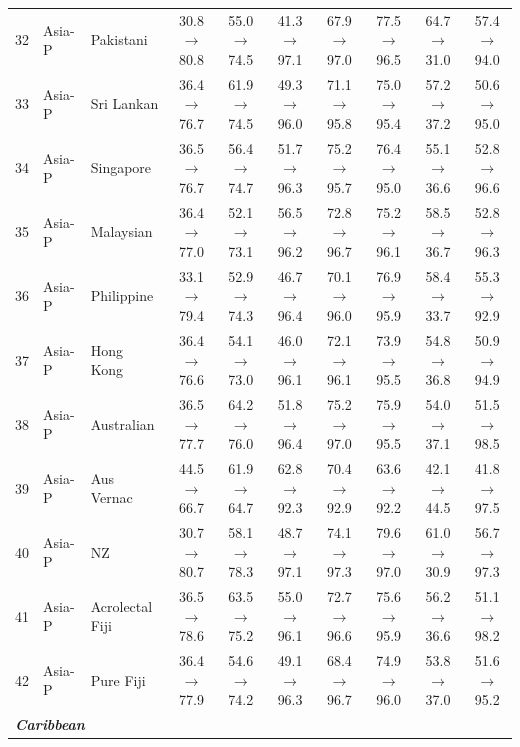 \begin{table}[t]
{\begin{tabular}{rll c c c c c c c}
32 & Asia-P & Pakistani & 30.8$\rightarrow$80.8 & 55.0$\rightarrow$74.5 & 41.3$\rightarrow$97.1 & 67.9$\rightarrow$97.0 & 77.5$\rightarrow$96.5 & 64.7$\rightarrow$31.0 & 57.4$\rightarrow$94.0 \\
33 & Asia-P & Sri Lankan & 36.4$\rightarrow$76.7 & 61.9$\rightarrow$74.5 & 49.3$\rightarrow$96.0 & 71.1$\rightarrow$95.8 & 75.0$\rightarrow$95.4 & 57.2$\rightarrow$37.2 & 50.6$\rightarrow$95.0 \\
34 & Asia-P & Singapore & 36.5$\rightarrow$76.7 & 56.4$\rightarrow$74.7 & 51.7$\rightarrow$96.3 & 75.2$\rightarrow$95.7 & 76.4$\rightarrow$95.0 & 55.1$\rightarrow$36.6 & 52.8$\rightarrow$96.6 \\
35 & Asia-P & Malaysian & 36.4$\rightarrow$77.0 & 52.1$\rightarrow$73.1 & 56.5$\rightarrow$96.2 & 72.8$\rightarrow$96.7 & 75.2$\rightarrow$96.1 & 58.5$\rightarrow$36.7 & 52.8$\rightarrow$96.3 \\
36 & Asia-P & Philippine & 33.1$\rightarrow$79.4 & 52.9$\rightarrow$74.3 & 46.7$\rightarrow$96.4 & 70.1$\rightarrow$96.0 & 76.9$\rightarrow$95.9 & 58.4$\rightarrow$33.7 & 55.3$\rightarrow$92.9 \\
37 & Asia-P & Hong Kong & 36.4$\rightarrow$76.6 & 54.1$\rightarrow$73.0 & 46.0$\rightarrow$96.1 & 72.1$\rightarrow$96.1 & 73.9$\rightarrow$95.5 & 54.8$\rightarrow$36.8 & 50.9$\rightarrow$94.9 \\
38 & Asia-P & Australian & 36.5$\rightarrow$77.7 & 64.2$\rightarrow$76.0 & 51.8$\rightarrow$96.4 & 75.2$\rightarrow$97.0 & 75.9$\rightarrow$95.5 & 54.0$\rightarrow$37.1 & 51.5$\rightarrow$98.5 \\
39 & Asia-P & Aus Vernac & 44.5$\rightarrow$66.7 & 61.9$\rightarrow$64.7 & 62.8$\rightarrow$92.3 & 70.4$\rightarrow$92.9 & 63.6$\rightarrow$92.2 & 42.1$\rightarrow$44.5 & 41.8$\rightarrow$97.5 \\
40 & Asia-P & NZ & 30.7$\rightarrow$80.7 & 58.1$\rightarrow$78.3 & 48.7$\rightarrow$97.1 & 74.1$\rightarrow$97.3 & 79.6$\rightarrow$97.0 & 61.0$\rightarrow$30.9 & 56.7$\rightarrow$97.3 \\
41 & Asia-P & Acrolectal Fiji & 36.5$\rightarrow$78.6 & 63.5$\rightarrow$75.2 & 55.0$\rightarrow$96.1 & 72.7$\rightarrow$96.6 & 75.6$\rightarrow$95.9 & 56.2$\rightarrow$36.6 & 51.1$\rightarrow$98.2 \\
42 & Asia-P & Pure Fiji & 36.4$\rightarrow$77.9 & 54.6$\rightarrow$74.2 & 49.1$\rightarrow$96.3 & 68.4$\rightarrow$96.7 & 74.9$\rightarrow$96.0 & 53.8$\rightarrow$37.0 & 51.6$\rightarrow$95.2 \\
\midrule
\multicolumn{10}{l}{\textit{\textbf{Caribbean}}} \\

\end{tabular}}
\end{table}
